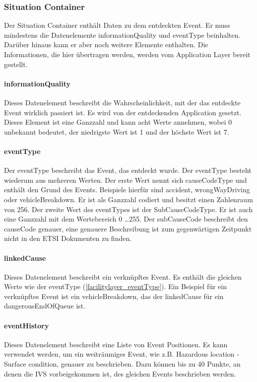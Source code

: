 \subsubsection{Situation Container}
Der Situation Container enthält Daten zu dem entdeckten Event. Er muss mindestens die Datenelemente informationQuality und eventType beinhalten. Darüber hinaus kann er aber noch weitere Elemente enthalten. Die Informationen, die hier übertragen werden, werden vom Application Layer bereit gestellt.

\paragraph{informationQuality}
Dieses Datenelement beschreibt die Wahrscheinlichkeit, mit der das entdeckte Event wirklich passiert ist. Es wird von der entdeckenden Application gesetzt. Dieses Element ist eine Ganzzahl und kann acht Werte annehmen, wobei 0 unbekannt bedeutet, der niedrigste Wert ist 1 und der höchste Wert ist 7.

\paragraph{eventType \label{facilitylayer_eventType}}
Der eventType beschreibt das Event, das entdeckt wurde. Der eventType besteht wiederum aus mehreren Werten. Der erste Wert nennt sich causeCodeType und enthält den Grund des Events. Beispiele hierfür sind accident,  wrongWayDriving oder vehicleBreakdown. Er ist als Ganzzahl codiert und besitzt einen Zahlenraum von 256. Der zweite Wert des eventTypes ist der SubCauseCodeType. Er ist auch eine Ganzzahl mit dem Wertebereich 0 \dots 255. Der subCauseCode beschreibt den causeCode genauer, eine genauere Beschreibung ist zum gegenwärtigen Zeitpunkt nicht in den \ac{ETSI} Dokumenten zu finden.

\paragraph{linkedCause}
Dieses Datenelement beschreibt ein verknüpftes Event. Es enthält die gleichen Werte wie der eventType (\ref{facilitylayer_eventType}). Ein Beispiel für ein verknüpftes Event ist ein vehicleBreakdown, das der linkedCause für ein dangerousEndOfQueue ist.  



\paragraph{eventHistory}
Dieses Datenelement beschreibt eine Liste von Event Positionen. Es kann verwendet werden, um ein weiträumiges Event, wie z.B.  Hazardous location - Surface condition\grqq, genauer zu beschrieben. Dazu können bis zu 40 Punkte, an denen die \ac{IVS} vorbeigekommen ist, des gleichen Events beschrieben werden.


